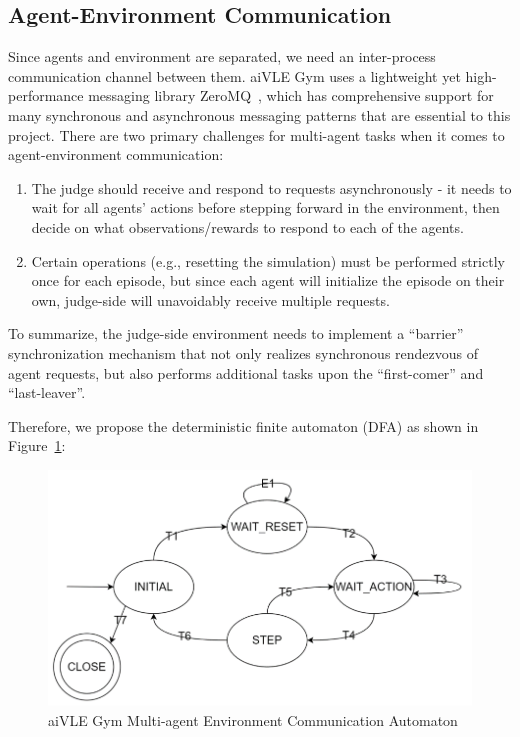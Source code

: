 \subsection{Agent-Environment Communication}
\label{ss:agent-env-communication}
Since agents and environment are separated, we need an inter-process communication channel between them. aiVLE Gym uses a lightweight yet high-performance messaging library ZeroMQ~\parencite{zeromq}, which has comprehensive support for many synchronous and asynchronous messaging patterns that are essential to this project. There are two primary challenges for multi-agent tasks when it comes to agent-environment communication:
\begin{enumerate}
    \item The judge should receive and respond to requests asynchronously - it needs to wait for all agents' actions before stepping forward in the environment, then decide on what observations/rewards to respond to each of the agents.
    \item Certain operations (e.g., resetting the simulation) must be performed strictly once for each episode, but since each agent will initialize the episode on their own, judge-side will unavoidably receive multiple requests.
\end{enumerate}

To summarize, the judge-side environment needs to implement a ``barrier'' synchronization mechanism that not only realizes synchronous rendezvous of agent requests, but also performs additional tasks upon the ``first-comer'' and ``last-leaver''. 

Therefore, we propose the deterministic finite automaton (DFA) as shown in Figure~\ref{fig:aivle-gym-multi-dfa}:
\begin{figure}[H]
    \centering
    \includegraphics{images/aivle-gym-multi-dfa.png}
    \caption{aiVLE Gym Multi-agent Environment Communication Automaton}
    \label{fig:aivle-gym-multi-dfa}
\end{figure}

